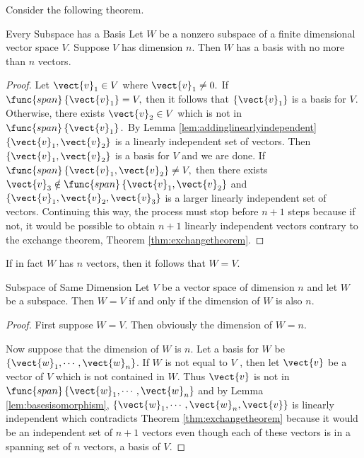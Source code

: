 Consider the following theorem. 

\begin{theorem}{Every Subspace has a Basis}\label{thm:everysubspacebasis}
Let $W$ be a nonzero subspace of a finite dimensional vector
space $V$. Suppose $V$ has dimension $n$.
 Then $W$ has a basis with no more than $n$
vectors.
\end{theorem}

\begin{proof}
Let $\vect{v}_{1}\in V$ where $\vect{v}_{1}\neq 0.$ If $
\func{span}\left\{ \vect{v}_{1}\right\} =V,$ then it follows that $\left\{ \vect{v}
_{1}\right\} $ is a basis for $V$. Otherwise, there exists $\vect{v}
_{2}\in V$ which is not in $\func{span}\left\{ \vect{v}_{1}\right\} .$ By
Lemma \ref{lem:addinglinearlyindependent} $\left\{ \vect{v}_{1},\vect{v}_{2}\right\} $ is a
linearly independent set of vectors. Then $\left\{ \vect{v}_{1},\vect{v}
_{2}\right\} $ is a basis for $V$ and we are done. If $\func{span}\left\{ \vect{v}_{1},
\vect{v}_{2}\right\} \neq V,$ then there exists $\vect{v}_{3}\notin \func{
span}\left\{ \vect{v}_{1},\vect{v}_{2}\right\} $ and $\left\{ \vect{v}
_{1},\vect{v}_{2},\vect{v}_{3}\right\} $ is a larger linearly
independent set of vectors. Continuing this way, the process must stop
before $n+1$ steps because if not, it would be possible to obtain $n+1$
linearly independent vectors contrary to the exchange theorem, Theorem \ref{thm:exchangetheorem}. 
\end{proof}

If in fact $W$ has $n$ vectors, then it follows that $W=V$. 

\begin{theorem}{Subspace of Same Dimension}\label{thm:subspacevectorspace}
Let $V$ be a vector space of dimension $n$ and let $W$ be a
subspace. Then $W=V$ if and only if the dimension of $W$ is also $n$.
\end{theorem}

\begin{proof}First suppose $W=V.$ Then obviously the dimension of $W=n.$

Now suppose that the dimension of $W$ is $n$. Let a basis for $W$ be $
\left\{ \vect{w}_{1},\cdots ,\vect{w}_{n}\right\} $. If $W$ is not equal to $V$
, then let $\vect{v}$ be a vector of $V$ which is not contained in $W.$ Thus $
\vect{v}$ is not in $\func{span}\left\{ \vect{w}_{1},\cdots ,\vect{w}
_{n}\right\} $ and by Lemma \ref{lem:basesisomorphism}, $\left\{ \vect{w}_{1},\cdots ,\vect{w}_{n},\vect{v}\right\} $ is linearly independent which contradicts
Theorem \ref{thm:exchangetheorem} because it would be an independent set of $n+1$
vectors even though each of these vectors is in a spanning set of $n$
vectors, a basis of $V$. 
\end{proof}

